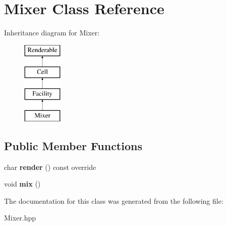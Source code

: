 \hypertarget{class_mixer}{}\section{Mixer Class Reference}
\label{class_mixer}
Inheritance diagram for Mixer\+:\begin{figure}[H]
\begin{center}
\leavevmode
\includegraphics[height=4.000000cm]{class_mixer}
\end{center}
\end{figure}
\subsection*{Public Member Functions}
\begin{DoxyCompactItemize}
\item 
\mbox{\label{class_mixer_a6e934b686923fe1dc274a260421b8991}} 
char {\bfseries render} () const override
\item 
\mbox{\label{class_mixer_a63f8e55c87c8f755dbbfd85b4f3421bc}} 
void {\bfseries mix} ()
\end{DoxyCompactItemize}


The documentation for this class was generated from the following file\+:\begin{DoxyCompactItemize}
\item 
Mixer.\+hpp\end{DoxyCompactItemize}
